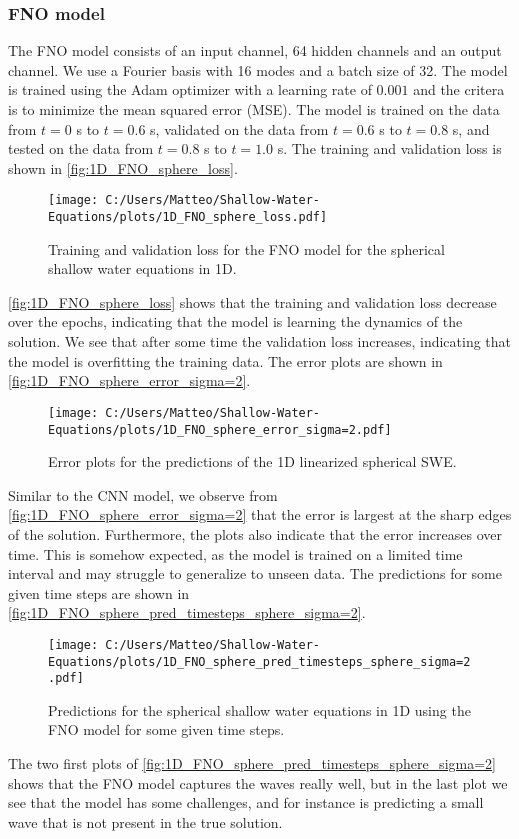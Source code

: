\subsubsection*{FNO model}
The FNO model consists of an input channel, 64 hidden channels and an output channel. We use a Fourier basis with 16 modes and a batch size of 32.
The model is trained using the Adam optimizer with a learning rate of $0.001$ and the critera is to minimize the mean squared error (MSE).
The model is trained on the data from $t = 0$ s to $t = 0.6$ s, validated on the data from $t = 0.6$ s to $t = 0.8$ s, and tested on the data from $t = 0.8$ s to $t = 1.0$ s.
The training and validation loss is shown in \autoref{fig:1D_FNO_sphere_loss}.
\begin{figure}[H]
    \centering
    \texttt{[image: C:/Users/Matteo/Shallow-Water-Equations/plots/1D\_FNO\_sphere\_loss.pdf]}
    \caption{Training and validation loss for the FNO model for the spherical shallow water equations in 1D.}\label{fig:1D_FNO_sphere_loss}
\end{figure}
\autoref{fig:1D_FNO_sphere_loss} shows that the training and validation loss decrease over the epochs, indicating that the model is learning the dynamics of the solution.
We see that after some time the validation loss increases, indicating that the model is overfitting the training data.
The error plots are shown in \autoref{fig:1D_FNO_sphere_error_sigma=2}.
\begin{figure}[H]
    \centering
    \texttt{[image: C:/Users/Matteo/Shallow-Water-Equations/plots/1D\_FNO\_sphere\_error\_sigma=2.pdf]}
    \caption{Error plots for the predictions of the 1D linearized spherical SWE.}\label{fig:1D_FNO_sphere_error_sigma=2}
\end{figure}
Similar to the CNN model, we observe from \autoref{fig:1D_FNO_sphere_error_sigma=2} that the error is largest at the sharp edges of the solution.
Furthermore, the plots also indicate that the error increases over time.
This is somehow expected, as the model is trained on a limited time interval and may struggle to generalize to unseen data.
The predictions for some given time steps are shown in \autoref{fig:1D_FNO_sphere_pred_timesteps_sphere_sigma=2}.
\begin{figure}[H]
    \centering
    \texttt{[image: C:/Users/Matteo/Shallow-Water-Equations/plots/1D\_FNO\_sphere\_pred\_timesteps\_sphere\_sigma=2.pdf]}
    \caption{Predictions for the spherical shallow water equations in 1D using the FNO model for some given time steps.}\label{fig:1D_FNO_sphere_pred_timesteps_sphere_sigma=2}
\end{figure}
The two first plots of \autoref{fig:1D_FNO_sphere_pred_timesteps_sphere_sigma=2} shows that the FNO model captures the waves really well, but in the last plot we see that the model has some challenges, and for instance is predicting a small wave that is not present in the true solution.

